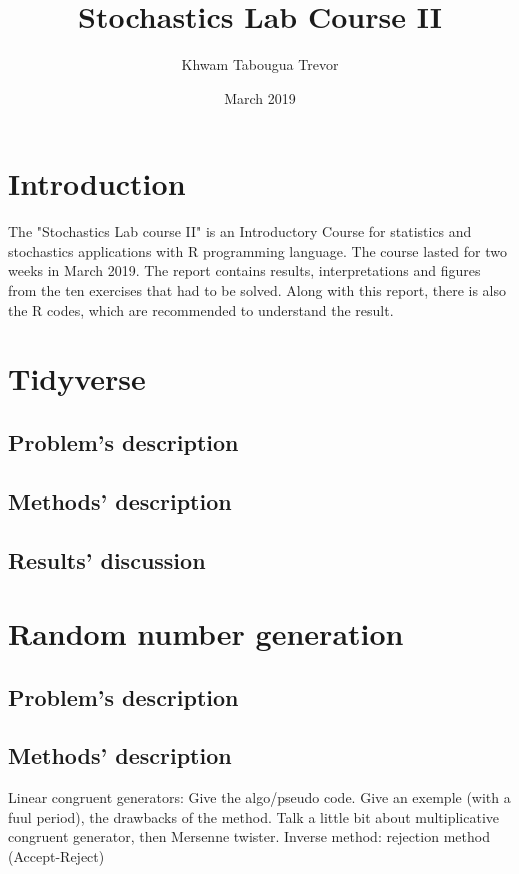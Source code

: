 \documentclass{report}
\title{\textbf{Stochastics Lab Course II}}
\author{Khwam Tabougua Trevor}
\date{March 2019}
\begin{document}
	
\maketitle

\chapter*{Introduction}

The "Stochastics Lab course II" is an Introductory Course for
statistics and stochastics applications with R programming language. The course lasted for two weeks in March 2019. The report contains results, interpretations and figures from the ten exercises that had to be solved. Along with this report, there is also the R codes, which are recommended to understand the result.

\tableofcontents
\chapter{Tidyverse}
\section{Problem's description}

\section{Methods' description}

\section{Results' discussion}


\chapter{Random number generation}
\section{Problem's description}

\section{Methods' description}
Linear congruent generators: Give the algo/pseudo code. Give an 
exemple (with a fuul period), the drawbacks of the method. Talk a 
little bit about multiplicative congruent generator, then Mersenne
twister.
Inverse method:
rejection method (Accept-Reject)
\end{document}
